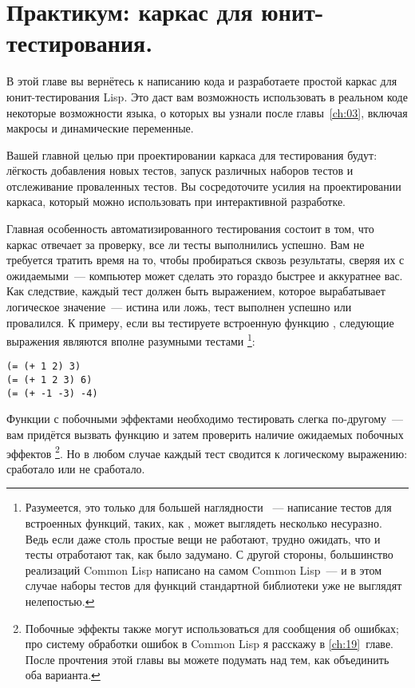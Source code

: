 \chapter{Практикум: каркас для юнит-тестирования.}
\label{ch:09}

В этой главе вы вернётесь к написанию кода и разработаете простой каркас для
юнит-тестирования Lisp. Это даст вам возможность использовать в реальном коде некоторые
возможности языка, о которых вы узнали после главы~\ref{ch:03}, включая макросы и динамические
переменные.

Вашей главной целью при проектировании каркаса для тестирования будут: лёгкость добавления
новых тестов, запуск различных наборов тестов и отслеживание проваленных тестов. Вы
сосредоточите усилия на проектировании каркаса, который можно использовать при
интерактивной разработке.

Главная особенность автоматизированного тестирования состоит в том, что каркас отвечает за
проверку, все ли тесты выполнились успешно. Вам не требуется тратить время на то, чтобы
пробираться сквозь результаты, сверяя их с ожидаемыми~--- компьютер может сделать это
гораздо быстрее и аккуратнее вас. Как следствие, каждый тест должен быть выражением,
которое вырабатывает логическое значение~--- истина или ложь, тест выполнен успешно или
провалился. К примеру, если вы тестируете встроенную функцию \code{+}, следующие выражения
являются вполне разумными тестами \footnote{Разумеется, это только для большей наглядности
 ~--- написание тестов для встроенных функций, таких, как \code{+}, может выглядеть
  несколько несуразно. Ведь если даже столь простые вещи не работают, трудно ожидать, что
  и тесты отработают так, как было задумано. С другой стороны, большинство реализаций
  Common Lisp написано на самом Common Lisp~--- и в этом случае наборы тестов для функций
  стандартной библиотеки уже не выглядят нелепостью.}:

\begin{lstlisting}
(= (+ 1 2) 3)
(= (+ 1 2 3) 6)
(= (+ -1 -3) -4)
\end{lstlisting}

Функции с побочными эффектами необходимо тестировать слегка по-другому~--- вам придётся
вызвать функцию и затем проверить наличие ожидаемых побочных эффектов \footnote{Побочные
  эффекты также могут использоваться для сообщения об ошибках; про систему обработки
  ошибок в Common Lisp я расскажу в \ref{ch:19}~главе.  После прочтения этой главы вы можете
  подумать над тем, как объединить оба варианта.}. Но в любом случае каждый тест сводится
к логическому выражению: сработало или не сработало.


